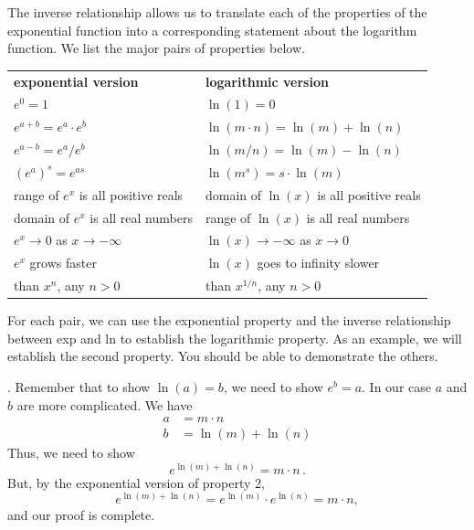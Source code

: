 The inverse relationship allows us to translate each of the properties
of the exponential function into a corresponding statement about the
logarithm function. We list the major pairs of properties below.
\begin{center}


\begin{tabular}{ll}

{\bf exponential version} & {\bf logarithmic version}\\[5pt]
  $e^{0}=1$          & $\ln(1)=0$\\
  $e^{\displaystyle a+b}=e^{\displaystyle a}\cdot e^{\displaystyle b}$            & $\ln(m\cdot n)=\ln(m) + \ln(n)$\\
  $e^{\displaystyle a-b} = e^{\displaystyle a}/e^{\displaystyle b}$               & $\ln(m/n) = \ln(m) - \ln(n)$ \\
  $(e^{\displaystyle a})^{\displaystyle s} = e^{\displaystyle as}$                & $\ln(m^s) = s \cdot \ln(m)$ \\
 range of $e^{\displaystyle x}$ is all positive reals & domain of $\ln(x)$ is all positive reals\\
domain of $e^{\displaystyle x}$ is all real numbers & range of $\ln(x)$ is all real numbers \\
$e^{\displaystyle x} \to 0$ as $x \to -\infty$ &
	$\ln(x) \to -\infty$ as $x \to 0$ \\
$e^{\displaystyle x}$ grows faster & $\ln(x)$ goes to infinity slower\\
\hspace{.25in} than $x^n$, any $n> 0$ & \hspace{.25in} than $x^{1/n}$, any  $n > 0$
\end{tabular}
\end{center}


For each pair, we can use the exponential property and the inverse
relationship between exp and ln to establish the logarithmic property.
As an example, we will establish the second property.  You should be
able to demonstrate the others.





. Remember that to show
$\ln(a)=b$, we need to show $e^b=a$.  In our case $a$ and $b$ are more
complicated.  We have
\begin{align*}
a &=  m\cdot n  \\
b &=  \ln(m)+\ln(n)
\end{align*}
Thus, we need to show
\[
e^{\displaystyle \ln(m)+\ln(n)} = m \cdot n \, .
\]
But, by the exponential version of property 2, 
	\[
e^{\displaystyle \ln(m)+\ln(n)} = 
		e^{\displaystyle \ln(m)} \cdot
		e^{\displaystyle \ln(n)} = m \cdot n,
\]
and our proof is complete.



